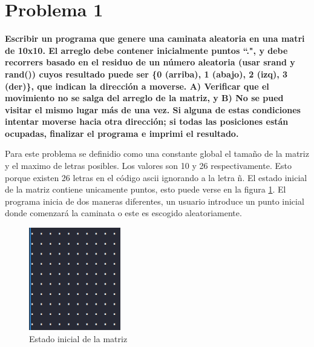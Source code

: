 \section*{Problema 1}
\textbf{Escribir un programa que genere una caminata aleatoria en una matri de 10x10. El arreglo debe contener inicialmente puntos ``.", y debe recorrers basado en el residuo de un número aleatoria (usar srand y rand()) cuyos resultado puede ser \{0 (arriba), 1 (abajo), 2 (izq), 3 (der)\}, que indican la dirección a moverse. A) Verificar que el movimiento no se salga del arreglo de la matriz, y B) No se pued visitar el mismo lugar más de una vez. Si alguna de estas condiciones intentar moverse hacia otra dirección; si todas las posiciones están ocupadas, finalizar el programa e imprimi el resultado.}

Para este problema se definidio como una constante global el tamaño de la matriz y el maximo de letras posibles. Los valores son 10 y 26 respectivamente. Esto porque existen 26 letras en el código ascii ignorando a la letra ñ. El estado inicial de la matriz contiene unicamente puntos, esto puede verse en la figura \ref{fig:initial_state_problem1}. El programa inicia de dos maneras diferentes, un usuario introduce un punto inicial donde comenzará la caminata o este es escogido aleatoriamente.

\begin{figure}[H]
    \centering
    \includegraphics[width=4cm]{Graphics/initial_problem1.png}
    \caption{Estado inicial de la matriz}
    \label{fig:initial_state_problem1}
\end{figure}

